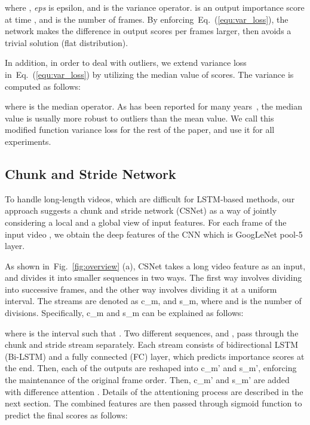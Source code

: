 \documentclass[letterpaper]{article} \usepackage{aaai19}  \usepackage{times}  \usepackage{helvet}  \usepackage{courier}  \usepackage{url}  \usepackage{graphicx}  \frenchspacing  \setlength{\pdfpagewidth}{8.5in}  \setlength{\pdfpageheight}{11in}
\newcommand{\figref}[1]{Fig.~\ref{#1}}
\newcommand{\eqnref}[1]{Eq.~(\ref{#1})}
\begin{document}
where , \textit{eps} is epsilon, and  is the variance operator.  is an output importance score at time , and  is the number of frames. By enforcing~\eqnref{equ:var_loss}, the network makes the difference in output scores per frames larger, then avoids a trivial solution (flat distribution).

In addition, in order to deal with outliers, we extend variance loss in~\eqnref{equ:var_loss} by utilizing the median value of scores. The variance is computed as follows:

where  is the median operator. As has been reported for many years~\cite{Pratt1975medianfilter,Huang1979median,Zhang2014Wmedian}, the median value is usually more robust to outliers than the mean value. We call this modified function variance loss for the rest of the paper, and use it for all experiments.

\fi

\subsection{Chunk and Stride Network}
To handle long-length videos, which are difficult for LSTM-based methods, our approach suggests a chunk and stride network (CSNet) as a way of jointly considering a local and a global view of input features. For each frame of the input video , we obtain the deep features  of the CNN which is GoogLeNet pool-5 layer.

As shown in~\figref{fig:overview} (a), CSNet takes a long video feature  as an input, and divides it into  smaller sequences in two ways. The first way involves dividing  into successive frames, and the other way involves dividing it at a uniform interval. The streams are denoted as c_{m}, and s_{m}, where  and  is the number of divisions. Specifically, c_{m} and s_{m} can be explained as follows:

where  is the interval such that . Two different sequences,  and , pass through the chunk and stride stream separately. Each stream consists of bidirectional LSTM (Bi-LSTM) and a fully connected (FC) layer, which predicts importance scores at the end. Then, each of the outputs are reshaped into c_{m}' and s_{m}', enforcing the maintenance of the original frame order. Then, c_{m}' and s_{m}' are added with difference attention . Details of the attentioning process are described in the next section. The combined features are then passed through sigmoid function to predict the final scores  as follows:

\fi
\end{document}
